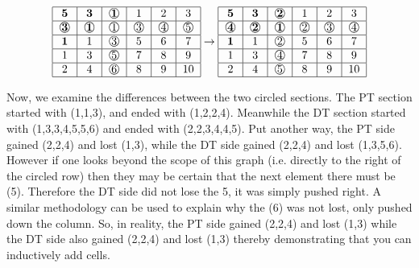 \documentclass{amsart}
\theoremstyle{definition}
\newcommand{\cir}[1]{\raisebox{.5pt}{\textcircled{\raisebox{-.9pt} {#1}}}}
\begin{document}
\begin{figure}[h]
	\[
	\begin{tabular}{|c|c|c|c|c|c|}
		\hline
		$\mathbf{5}$&$\mathbf{3}$&$\cir{$\mathbf{1}$}$&1&2&3\\
		\hline
		$\cir{$\mathbf{3}$}$&$\cir{$\mathbf{1}$}$&$\cir{1}$&$\cir{3}$&$\cir{4}$&$\cir{5}$\\
		\hline
		$\mathbf{1}$&1&$\cir{3}$&5&6&7\\
		\hline
		1&3&$\cir{5}$&7&8&9\\
		\hline
		2&4&$\cir{6}$&8&9&10\\
		\hline
	\end{tabular}
	\rightarrow
	\begin{tabular}{|c|c|c|c|c|c|}
		\hline
		$\mathbf{5}$&$\mathbf{3}$&$\cir{\textbf{2}}$&1&2&3\\
		\hline
		$\cir{\textbf{4}}$&$\cir{\textbf{2}}$&$\cir{\textbf{1}}$&$\cir{2}$&$\cir{3}$&$\cir{4}$\\
		\hline
		$\mathbf{1}$&1&$\cir{2}$&5&6&7\\
		\hline
		1&3&$\cir{4}$&7&8&9\\
		\hline
		2&4&$\cir{5}$&8&9&10\\
		\hline
	\end{tabular}
	\]
\end{figure}

Now, we examine the differences between the two circled sections.  The PT section started with (1,1,3), and ended with (1,2,2,4).  Meanwhile the DT section started with (1,3,3,4,5,5,6) and ended with (2,2,3,4,4,5).  Put another way, the PT side gained (2,2,4) and lost (1,3), while the DT side gained (2,2,4) and lost (1,3,5,6).  However if one looks beyond the scope of this graph (i.e. directly to the right of the circled row) then they may be certain that the next element there must be (5).  Therefore the DT side did not lose the 5, it was simply pushed right.  A similar methodology can be used to explain why the (6) was not lost, only pushed down the column.  So, in reality, the PT side gained (2,2,4) and lost (1,3) while the DT side also gained (2,2,4) and lost (1,3) thereby demonstrating that you can inductively add cells.
\end{document}

